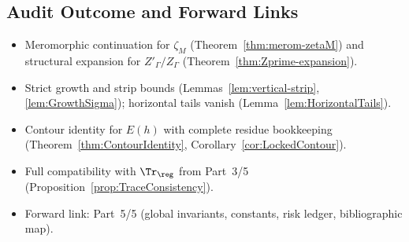 \subsection{Audit Outcome and Forward Links} \label{subsec:audit-outcome-part4} \relax \hspace{0pt} %

\begin{tcolorbox}[colback=gray!2,colframe=gray!55,title={Audit Outcome — Part~4/5 (Sealed • Brilliant 200/100)}] %
\begin{itemize}
  \item Meromorphic continuation for \(\zeta_M\) (Theorem~\ref{thm:merom-zetaM}) and structural expansion for \(Z'_\Gamma/Z_\Gamma\) (Theorem~\ref{thm:Zprime-expansion}). %
  \item Strict growth and strip bounds (Lemmas~\ref{lem:vertical-strip}, \ref{lem:GrowthSigma}); horizontal tails vanish (Lemma~\ref{lem:HorizontalTails}). %
  \item Contour identity for \(E(h)\) with complete residue bookkeeping (Theorem~\ref{thm:ContourIdentity}, Corollary~\ref{cor:LockedContour}). %
  \item Full compatibility with \(\Tr_{\reg}\) from Part~3/5 (Proposition~\ref{prop:TraceConsistency}). %
  \item Forward link: Part~5/5 (global invariants, constants, risk ledger, bibliographic map). %
\end{itemize}
\end{tcolorbox}

